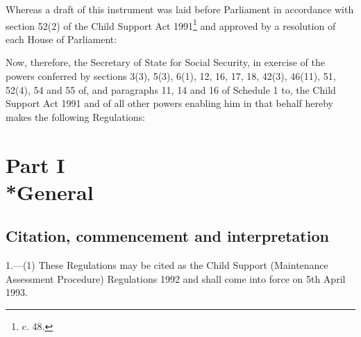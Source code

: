 \documentclass[a4paper,12pt]{article}
\title{\regstitle}
\author{S.I. 1992 No. 1813}
\date{Made 20th July 1992\\Coming into force 5th April 1993}
\begin{document}
\maketitle

\noindent
 Whereas a draft of this instrument was laid before Parliament in accordance with section 52(2) of the Child Support Act 1991\footnote{ c. 48.} and approved by a resolution of each House of Parliament:

 Now, therefore, the Secretary of State for Social Security, in exercise of the powers conferred by sections 3(3), 5(3), 6(1), 12, 16, 17, 18, 42(3), 46(11), 51, 52(4), 54 and 55 of, and paragraphs 11, 14 and 16 of Schedule 1 to, the Child Support Act 1991 and of all other powers enabling him in that behalf hereby makes the following Regulations:

{\sloppy

\tableofcontents

}

\setcounter{secnumdepth}{-2}

\section[Part I --- General]{Part I\\*General}

\renewcommand\parthead{--- Part I}

\subsection[1. Citation, commencement and interpretation]{Citation, commencement and interpretation}

1.—(1) These Regulations may be cited as the Child Support (Maintenance Assessment Procedure) Regulations 1992 and shall come into force on 5th April 1993.
\end{document}
